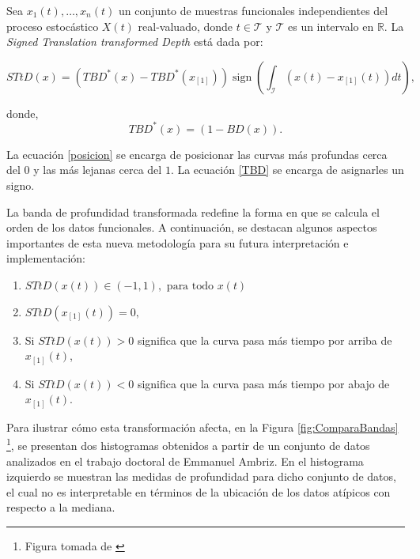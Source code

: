     \begin{defn}
        Sea  $x_1(t), \dots , x_n(t)$ un conjunto de muestras funcionales independientes del proceso estocástico $X(t)$ real-valuado,  donde $t \in \mathcal{T}$ y $\mathcal{T}$ es un intervalo en $\mathbb{R}$. La \textit{Signed Translation transformed Depth} está dada por:

    \begin{equation}\label{TBD}
    STtD(x)=\left(T B D^*(x)-T B D^*\left(x_{[1]}\right)\right) \operatorname{sign}\left(\int_{\mathcal{I}}\left(x(t)-x_{[1]}(t)\right) d t\right),
    \end{equation}

    donde, 
    \begin{equation}\label{posicion}
        T B D^*(x)=(1-B D(x)).
    \end{equation}

    La ecuación \eqref{posicion} se encarga de posicionar las curvas más profundas cerca del $0$ y las más lejanas cerca del $1$. La ecuación \eqref{TBD} se encarga de asignarles un signo.
        
    \end{defn}


La banda de profundidad transformada redefine la forma en que se calcula el orden de los datos funcionales. A continuación, se destacan algunos aspectos importantes de esta nueva metodología para su futura interpretación e implementación:

\begin{enumerate}
    \item $STtD(x(t)) \in (-1, 1), \text{ para todo } x(t)$
    \item $STtD(x_{[1]}(t)) = 0,$
    \item Si $STtD(x(t)) > 0$ significa que la curva pasa más tiempo por arriba de $x_{[1]}(t)$,
    \item Si $STtD(x(t)) < 0$ significa que la curva pasa más tiempo por abajo de $x_{[1]}(t)$.
\end{enumerate}

Para ilustrar cómo esta transformación afecta, en la Figura \ref{fig:ComparaBandas} \footnote{Figura tomada de \cite{BandaEmanuel}}, se presentan dos histogramas obtenidos a partir de un conjunto de datos analizados en el trabajo doctoral de Emmanuel Ambriz. En el histograma izquierdo se muestran las medidas de profundidad para dicho conjunto de datos, el cual no es interpretable en términos de la ubicación de los datos atípicos con respecto a la mediana.

